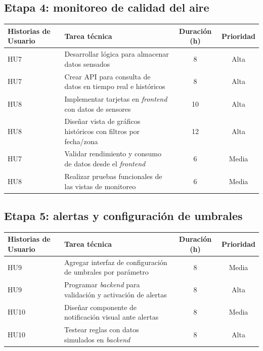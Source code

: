 \documentclass[
11pt, %
]{charter}
\begin{document}
\subsection*{Etapa 4: monitoreo de calidad del aire}
\begin{tabular}{|p{2.5cm}|p{7.5cm}|c|c|}
\hline
\textbf{Historias de Usuario} & \textbf{Tarea técnica} & \textbf{Duración (h)} & \textbf{Prioridad} \\
\hline
HU7 & Desarrollar lógica para almacenar datos sensados & 8 & Alta \\
\hline
HU7 & Crear API para consulta de datos en tiempo real e históricos & 8 & Alta \\
\hline
HU8 & Implementar tarjetas en \textit{frontend} con datos de sensores & 10 & Alta \\
\hline
HU8 & Diseñar vista de gráficos históricos con filtros por fecha/zona & 12 & Alta \\
\hline
HU7 & Validar rendimiento y consumo de datos desde el \textit{frontend} & 6 & Media \\
\hline
HU8 & Realizar pruebas funcionales de las vistas de monitoreo & 6 & Media \\
\hline
\end{tabular}

\subsection*{Etapa 5: alertas y configuración de umbrales}
\begin{tabular}{|p{2.5cm}|p{7.5cm}|c|c|}
\hline
\textbf{Historias de Usuario} & \textbf{Tarea técnica} & \textbf{Duración (h)} & \textbf{Prioridad} \\
\hline
HU9 & Agregar interfaz de configuración de umbrales por parámetro & 8 & Media \\
\hline
HU9 & Programar \textit{backend} para validación y activación de alertas & 8 & Alta \\
\hline
HU10 & Diseñar componente de notificación visual ante alertas & 8 & Media \\
\hline
HU10 & Testear reglas con datos simulados en \textit{backend} & 8 & Alta \\
\hline
\end{tabular}
\end{document}
